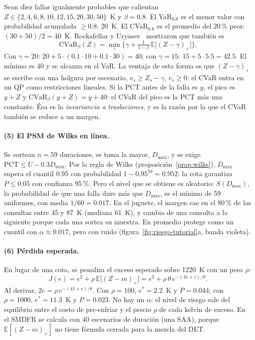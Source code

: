 \begin{ejemplo}\label{ej:ru}
Sean diez fallas igualmente probables que calientan
$Z\in\{2,4,6,8,10,12,15,20,30,50\}$~K y $\beta=0.8$. El VaR$_{0.8}$ es el menor valor con
probabilidad acumulada $\ge0.8$: 20~K. El CVaR$_{0.8}$ es el promedio del 20\,\% peor:
$(30+50)/2=40$~K. Rockafellar y Uryasev~\cite{rockafellar2000} mostraron que también es
\[
\mathrm{CVaR}_\beta(Z)=\min_\gamma\Big\{\gamma+\tfrac{1}{1-\beta}\,\mathbb E\big[(Z-\gamma)_+\big]\Big\}.
\]
Con $\gamma=20$: $20+5\cdot(0.1\cdot10+0.1\cdot30)=40$; con $\gamma=15$: $15+5\cdot5.5=42.5$. El mínimo es
40 y se alcanza en el VaR. La ventaja de esta forma es que $(Z-\gamma)_+$ se escribe con una
holgura por escenario, $v_s\ge Z_s-\gamma$, $v_s\ge0$: el CVaR entra en un QP como restricciones
lineales. Si la PCT antes de la falla es $y$, el pico es $y+Z$ y
$\mathrm{CVaR}_\beta(y+Z)=y+40$: el CVaR del pico es la PCT más una constante. Ésa es la
\emph{invariancia a traslaciones}, y es la razón por la que el CVaR también se reduce a un margen.
\end{ejemplo}

\paragraph{(5) El PSM de Wilks en línea.} Se sortean $n=59$ duraciones, se toma la mayor,
$D_{\max}$, y se exige $\mathrm{PCT}\le U-0.3D_{\max}$. Por la regla de Wilks
(proposición~\ref{prop:wilks}), $D_{\max}$ supera el cuantil 0.95 con probabilidad
$1-0.95^{59}=0.952$: la cota garantiza $P\le0.05$ con confianza 95\,\%. Pero el nivel que se
obtiene es aleatorio: $S(D_{\max})$, la probabilidad de que una falla dure más que $D_{\max}$, es el
mínimo de 59 uniformes, con media $1/60=0.017$. En el juguete, el margen cae en el 80\,\% de las
consultas entre 45 y 87~K (mediana 61~K), y cambia de una consulta a la siguiente porque cada una
sortea su muestra. En promedio protege como un cuantil con $\alpha\approx0.017$, pero con ruido
(figura~\ref{fig:riesgo-tutorial}a, banda violeta).

\paragraph{(6) Pérdida esperada.} En lugar de una cota, se penaliza el exceso esperado sobre
1220~K con un peso $\rho$:
\[
J(e)=e^2+\rho\,\mathbb E\big[(Z-m)_+\big]=e^2+\rho\,\theta\,e^{-(41+e)/\theta}.
\]
Al derivar, $2e=\rho\,e^{-(41+e)/\theta}$. Con $\rho=100$, $e^*=2.2$~K y $P=0.044$; con $\rho=1000$,
$e^*=11.3$~K y $P=0.023$. No hay un $\alpha$: el nivel de riesgo sale del equilibrio entre el costo
de pre-enfriar y el precio $\rho$ de cada kelvin de exceso. En el SMDFR se calcula con 40
escenarios de duración (una SAA), porque $\mathbb E[(Z-m)_+]$ no tiene fórmula cerrada para la
mezcla del DET.


